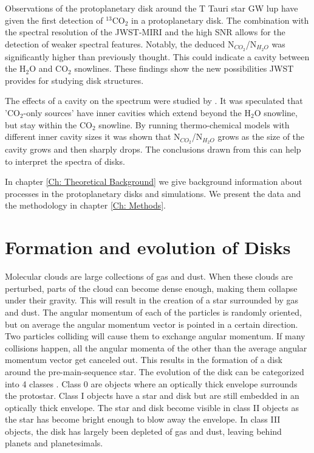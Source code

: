 \documentclass[twoside,single, authoryear, semicolon]{lion-msc}
\begin{document}
Observations of the protoplanetary disk around the T Tauri star GW lup have given the first detection of $^{13}$CO$_2$ in a protoplanetary disk. \cite{Grant_2023} The combination with the spectral resolution of the JWST-MIRI and the high SNR allows for the detection of weaker spectral features. Notably, the deduced N$_{CO_2}$/N$_{H_2O}$ was significantly higher than previously thought. This could indicate a cavity between the H$_2$O and CO$_2$ snowlines. These findings show the new possibilities JWST provides for studying disk structures. 

The effects of a cavity on the spectrum were studied by \cite{vlasblom2023midinfraredspectrattauri}. It was speculated that 'CO$_2$-only sources' have inner cavities which extend beyond the H$_2$O snowline, but stay within the CO$_2$ snowline. By running thermo-chemical models with different inner cavity sizes it was shown that N$_{CO_2}$/N$_{H_2O}$ grows as the size of the cavity grows and then sharply drops. The conclusions drawn from this can help to interpret the spectra of disks.

In chapter \ref{Ch: Theoretical Background} we give background information about processes in the protoplanetary disks and simulations. We present the data and the methodology in chapter \ref{Ch: Methods}.



\section{Formation and evolution of Disks}
Molecular clouds are large collections of gas and dust. When these clouds are perturbed, parts of the cloud can become dense enough, making them collapse under their gravity. This will result in the creation of a star surrounded by gas and dust. The angular momentum of each of the particles is randomly oriented, but on average the angular momentum vector is pointed in a certain direction. Two particles colliding will cause them to exchange angular momentum. If many collisions happen, all the angular momenta of the other than the average angular momentum vector get canceled out. This results in the formation of a disk around the pre-main-sequence star.
The evolution of the disk can be categorized into 4 classes \citep{1987ApJ...312..788A}. Class 0 are objects where an optically thick envelope surrounds the protostar. Class I objects have a star and disk but are still embedded in an optically thick envelope. The star and disk become visible in class II objects as the star has become bright enough to blow away the envelope. In class III objects, the disk has largely been depleted of gas and dust, leaving behind planets and planetesimals. 
\end{document}
